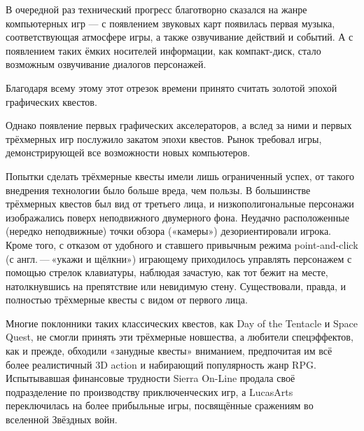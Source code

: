 В очередной раз технический прогресс благотворно сказался на жанре компьютерных игр — с появлением звуковых карт появилась первая музыка, соответствующая атмосфере игры, а также озвучивание действий и событий. А с появлением таких ёмких носителей информации, как компакт-диск, стало возможным озвучивание диалогов персонажей.

Благодаря всему этому этот отрезок времени принято считать золотой эпохой графических квестов.

Однако появление первых графических акселераторов, а вслед за ними и первых трёхмерных игр послужило закатом эпохи квестов. Рынок требовал игры, демонстрирующей все возможности новых компьютеров.

Попытки сделать трёхмерные квесты имели лишь ограниченный успех, от такого внедрения технологии было больше вреда, чем пользы. В большинстве трёхмерных квестов был вид от третьего лица, и низкополигональные персонажи изображались поверх неподвижного двумерного фона. Неудачно расположенные (нередко неподвижные) точки обзора («камеры») дезориентировали игрока. Кроме того, с отказом от удобного и ставшего привычным режима point-and-click (с англ. — «укажи и щёлкни») играющему приходилось управлять персонажем с помощью стрелок клавиатуры, наблюдая зачастую, как тот бежит на месте, натолкнувшись на препятствие или невидимую стену. Существовали, правда, и полностью трёхмерные квесты с видом от первого лица.

Многие поклонники таких классических квестов, как Day of the Tentacle и Space Quest, не смогли принять эти трёхмерные новшества, а любители спецэффектов, как и прежде, обходили «занудные квесты» вниманием, предпочитая им всё более реалистичный 3D action и набирающий популярность жанр RPG. Испытывавшая финансовые трудности Sierra On-Line продала своё подразделение по производству приключенческих игр, а LucasArts переключилась на более прибыльные игры, посвящённые сражениям во вселенной Звёздных войн.


